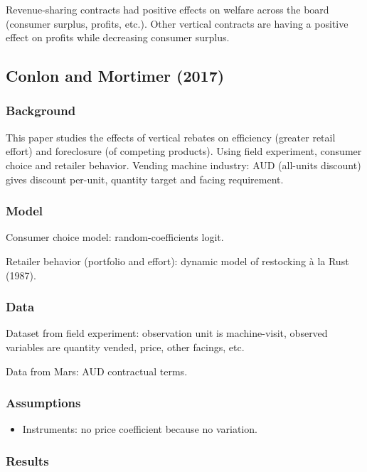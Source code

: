 Revenue-sharing contracts had positive effects on welfare across the board (consumer surplus, profits, etc.). Other vertical contracts are having a positive effect on profits while decreasing consumer surplus.

\newpage
\subsection{Conlon and Mortimer (2017)}

\subsubsection{Background}

This paper studies the effects of vertical rebates on efficiency (greater retail effort) and foreclosure (of competing products). Using field experiment, consumer choice and retailer behavior. Vending machine industry: AUD (all-units discount) gives discount per-unit, quantity target and facing requirement.

\subsubsection{Model}

Consumer choice model: random-coefficients logit.

Retailer behavior (portfolio and effort): dynamic model of restocking à la Rust (1987).

\subsubsection{Data}

Dataset from field experiment: observation unit is machine-visit, observed variables are quantity vended, price, other facings, etc.

Data from Mars: AUD contractual terms.

\subsubsection{Assumptions}

\begin{itemize}
\item Instruments: no price coefficient because no variation.
\end{itemize}

\subsubsection{Results}


